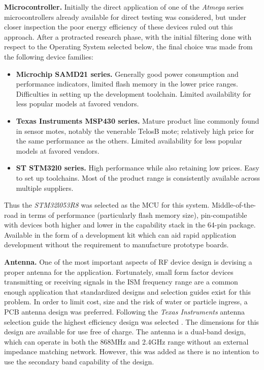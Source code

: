 \documentclass[10pt,nocopyrightspace]{ewsn-proc}
\begin{document}
\textbf{Microcontroller.} Initially the direct application of one of the \textit{Atmega} series microcontrollers already available for direct testing was considered, but under closer inspection the poor energy efficiency of these devices ruled out this approach. After a protracted research phase, with the initial filtering done with respect to the Operating System selected below, the final choice was made from the following device families:
\begin{itemize}
\item \textbf{Microchip SAMD21 series.} Generally good power consumption and performance indicators, limited flash memory in the lower price ranges. Difficulties in setting up the development toolchain. Limited availability for less popular models at favored vendors.
\item \textbf{Texas Instruments MSP430 series.} Mature product line commonly found in sensor motes, notably the venerable TelosB mote; relatively high price for the same performance as the others. Limited availability for less popular models at favored vendors.
\item \textbf{ST STM32l0 series.} High performance while also retaining low prices. Easy to set up toolchains. Most of the product range is consistently available across multiple suppliers.
\end{itemize}
Thus the \textit{STM32l053R8} was selected as the MCU for this system. Middle-of-the-road in terms of performance (particularly flash memory size), pin-compatible with devices both higher and lower in the capability stack in the 64-pin package. Available in the form of a development kit which can aid rapid application development without the requirement to manufacture prototype boards.

\textbf{Antenna.} One of the most important aspects of RF device design is devising a proper antenna for the application. Fortunately, small form factor devices transmitting or receiving signals in the ISM frequency range are a common enough application that standardized designs and selection guides exist for this problem. In order to limit cost, size and the risk of water or particle ingress, a PCB antenna design was preferred. Following the \textit{Texas Instruments} antenna selection guide \cite{antenna-select} the highest efficiency design was selected \cite{antenna-datasheet}. The dimensions for this design are available for use free of charge. The antenna is a dual-band design, which can operate in both the 868MHz and 2.4GHz range without an external impedance matching network. However, this was added as there is no intention to use the secondary band capability of the design.
\end{document}
